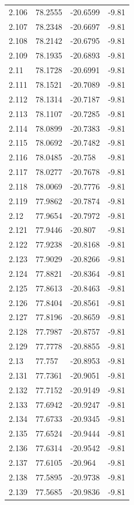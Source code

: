 \begin{tabular}{llll}
2.106 & 78.2555 & -20.6599 & -9.81 \\
2.107 & 78.2348 & -20.6697 & -9.81 \\
2.108 & 78.2142 & -20.6795 & -9.81 \\
2.109 & 78.1935 & -20.6893 & -9.81 \\
2.11 & 78.1728 & -20.6991 & -9.81 \\
2.111 & 78.1521 & -20.7089 & -9.81 \\
2.112 & 78.1314 & -20.7187 & -9.81 \\
2.113 & 78.1107 & -20.7285 & -9.81 \\
2.114 & 78.0899 & -20.7383 & -9.81 \\
2.115 & 78.0692 & -20.7482 & -9.81 \\
2.116 & 78.0485 & -20.758 & -9.81 \\
2.117 & 78.0277 & -20.7678 & -9.81 \\
2.118 & 78.0069 & -20.7776 & -9.81 \\
2.119 & 77.9862 & -20.7874 & -9.81 \\
2.12 & 77.9654 & -20.7972 & -9.81 \\
2.121 & 77.9446 & -20.807 & -9.81 \\
2.122 & 77.9238 & -20.8168 & -9.81 \\
2.123 & 77.9029 & -20.8266 & -9.81 \\
2.124 & 77.8821 & -20.8364 & -9.81 \\
2.125 & 77.8613 & -20.8463 & -9.81 \\
2.126 & 77.8404 & -20.8561 & -9.81 \\
2.127 & 77.8196 & -20.8659 & -9.81 \\
2.128 & 77.7987 & -20.8757 & -9.81 \\
2.129 & 77.7778 & -20.8855 & -9.81 \\
2.13 & 77.757 & -20.8953 & -9.81 \\
2.131 & 77.7361 & -20.9051 & -9.81 \\
2.132 & 77.7152 & -20.9149 & -9.81 \\
2.133 & 77.6942 & -20.9247 & -9.81 \\
2.134 & 77.6733 & -20.9345 & -9.81 \\
2.135 & 77.6524 & -20.9444 & -9.81 \\
2.136 & 77.6314 & -20.9542 & -9.81 \\
2.137 & 77.6105 & -20.964 & -9.81 \\
2.138 & 77.5895 & -20.9738 & -9.81 \\
2.139 & 77.5685 & -20.9836 & -9.81 \\

\end{tabular}
